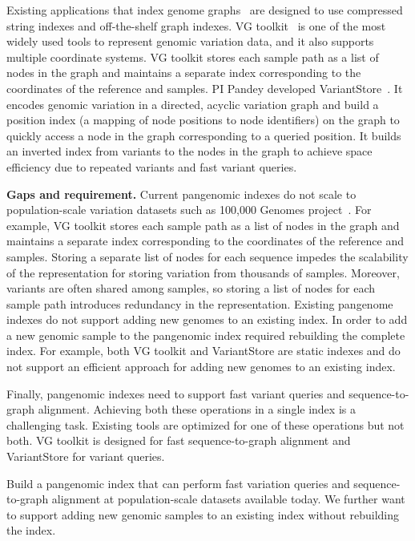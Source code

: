 Existing applications that index genome graphs~\cite{pandey2021variantstore,garrison2018variation} are designed to use compressed string indexes and off-the-shelf graph indexes. VG toolkit~\cite{garrison2018variation} is one of the most widely used tools to represent genomic variation data, and it also supports multiple coordinate systems. VG toolkit stores each sample path as a list of nodes in the graph and maintains a separate index corresponding to the coordinates of the reference and samples.
%
PI Pandey developed VariantStore~\cite{pandey2021variantstore}. It encodes genomic variation in a directed, acyclic variation graph and build a position index (a mapping of node positions to node identifiers) on the graph to quickly access a node in the graph corresponding to a queried position. It builds an inverted index from variants to the nodes in the graph to achieve space efficiency due to repeated variants and fast variant queries.

\noindent
\textbf{Gaps and requirement.}
Current pangenomic indexes do not scale to population-scale variation datasets such as 100,000 Genomes project~\cite{1002021100}. For example, VG toolkit stores each sample path as a list of nodes in the graph and maintains a separate index corresponding to the coordinates of the reference and samples. Storing a separate list of nodes for each sequence impedes the scalability of the representation for storing variation from thousands of samples. Moreover, variants are often shared among samples, so storing a list of nodes for each sample path introduces redundancy in the representation.
%
Existing pangenome indexes do not support adding new genomes to an existing index. In order to add a new genomic sample to the pangenomic index required rebuilding the complete index. For example, both VG toolkit and VariantStore are static indexes and do not support an efficient approach for adding new genomes to an existing index.

Finally, pangenomic indexes need to support fast variant queries and sequence-to-graph alignment. Achieving both these operations in a single index is a challenging task. Existing tools are optimized for one of these operations but not both. VG toolkit is designed for fast sequence-to-graph alignment and VariantStore for variant queries.


\begin{rproblem}
 Build a pangenomic index that can perform fast variation queries and sequence-to-graph alignment at population-scale datasets available today. We further want to support adding new genomic samples to an existing index without rebuilding the index.
\label{rprob:pangenomics}
\end{rproblem}
